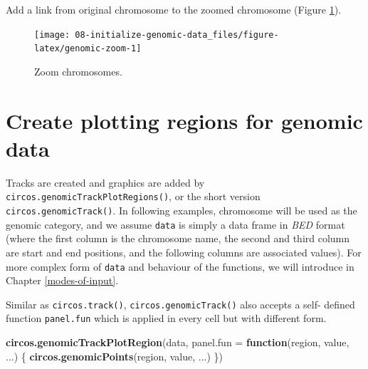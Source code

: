 \documentclass[]{book}
\newenvironment{Shaded}{\begin{snugshade}}{\end{snugshade}}
\newcommand{\KeywordTok}[1]{\textcolor[rgb]{0.13,0.29,0.53}{\textbf{#1}}}
\newcommand{\DataTypeTok}[1]{\textcolor[rgb]{0.13,0.29,0.53}{#1}}
\newcommand{\StringTok}[1]{\textcolor[rgb]{0.31,0.60,0.02}{#1}}
\newcommand{\OtherTok}[1]{\textcolor[rgb]{0.56,0.35,0.01}{#1}}
\newcommand{\ControlFlowTok}[1]{\textcolor[rgb]{0.13,0.29,0.53}{\textbf{#1}}}
\newcommand{\NormalTok}[1]{#1}
\theoremstyle{definition}
\theoremstyle{definition}
\theoremstyle{remark}
\begin{document}
Add a link from original chromosome to the zoomed chromosome (Figure
\ref{fig:genomic-zoom}).

\begin{Shaded}
\end{Shaded}

\begin{figure}

{\centering \texttt{[image: 08-initialize-genomic-data\_files/figure-latex/genomic-zoom-1]} 

}

\caption{Zoom chromosomes.}\label{fig:genomic-zoom}
\end{figure}

\chapter{Create plotting regions for genomic
data}\label{genomic-plotting-region}

Tracks are created and graphics are added by
\texttt{circos.genomicTrackPlotRegions()}, or the short version
\texttt{circos.genomicTrack()}. In following examples, chromosome will
be used as the genomic category, and we assume \texttt{data} is simply a
data frame in \emph{BED} format (where the first column is the
chromosome name, the second and third column are start and end
positions, and the following columns are associated values). For more
complex form of \texttt{data} and behaviour of the functions, we will
introduce in Chapter \ref{modes-of-input}.

Similar as \texttt{circos.track()}, \texttt{circos.genomicTrack()} also
accepts a self- defined function \texttt{panel.fun} which is applied in
every cell but with different form.

\begin{Shaded}
\begin{Highlighting}[]
\KeywordTok{circos.genomicTrackPlotRegion}\NormalTok{(data, }\DataTypeTok{panel.fun =} \ControlFlowTok{function}\NormalTok{(region, value, ...) \{}
    \KeywordTok{circos.genomicPoints}\NormalTok{(region, value, ...)}
\NormalTok{\})}
\end{Highlighting}
\end{Shaded}
\end{document}
